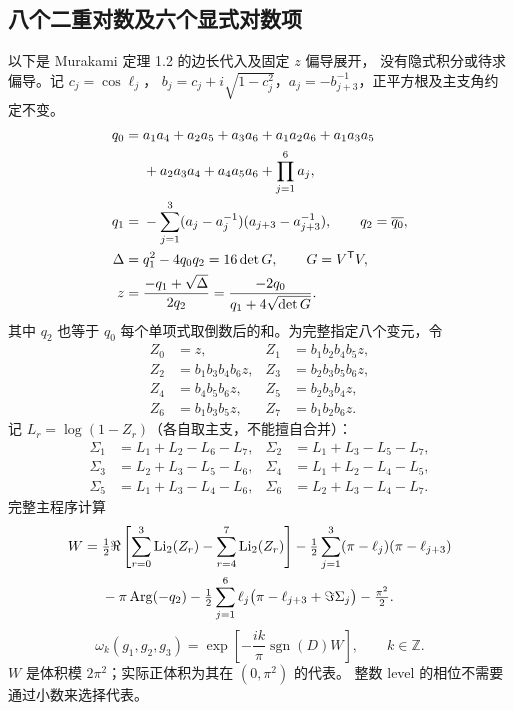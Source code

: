 \subsection{八个二重对数及六个显式对数项}

以下是 Murakami 定理 1.2 的边长代入及固定 $z$ 偏导展开，
没有隐式积分或待求偏导。记 $c_j=\cos\ell_j$，
$b_j=c_j+i\sqrt{1-c_j^2}$，$a_j=-b_{j+3}^{-1}$，正平方根及主支角约定不变。
\begin{align}
q_0={}&a_1a_4+a_2a_5+a_3a_6+a_1a_2a_6+a_1a_3a_5\notag\\
 &+a_2a_3a_4+a_4a_5a_6+\prod_{j=1}^6a_j,\\
q_1={}&-\sum_{j=1}^3(a_j-a_j^{-1})(a_{j+3}-a_{j+3}^{-1}),
\qquad q_2=\overline{q_0},\\
\Delta={}&q_1^2-4q_0q_2=16\det G,\qquad G=V^{\mathsf T}V,\\
z={}&\frac{-q_1+\sqrt\Delta}{2q_2}
     =\frac{-2q_0}{q_1+4\sqrt{\det G}}.
\end{align}
其中 $q_2$ 也等于 $q_0$ 每个单项式取倒数后的和。为完整指定八个变元，令
\begin{align}
 Z_0&=z,&Z_1&=b_1b_2b_4b_5z,\\
 Z_2&=b_1b_3b_4b_6z,&Z_3&=b_2b_3b_5b_6z,\\
 Z_4&=b_4b_5b_6z,&Z_5&=b_2b_3b_4z,\\
 Z_6&=b_1b_3b_5z,&Z_7&=b_1b_2b_6z.
\end{align}
记 $L_r=\log(1-Z_r)$（各自取主支，不能擅自合并）：
\begin{align}
\Sigma_1&=L_1+L_2-L_6-L_7,&\Sigma_2&=L_1+L_3-L_5-L_7,\\
\Sigma_3&=L_2+L_3-L_5-L_6,&\Sigma_4&=L_1+L_2-L_4-L_5,\\
\Sigma_5&=L_1+L_3-L_4-L_6,&\Sigma_6&=L_2+L_3-L_4-L_7.
\end{align}
完整主程序计算
\begin{align}
W={}&\tfrac12\Re\left[\sum_{r=0}^3\operatorname{Li}_2(Z_r)-\sum_{r=4}^7\operatorname{Li}_2(Z_r)\right]
 -\tfrac12\sum_{j=1}^3(\pi-\ell_j)(\pi-\ell_{j+3})\notag\\
&-\pi\operatorname{Arg}(-q_2)
 -\tfrac12\sum_{j=1}^6\ell_j\bigl(\pi-\ell_{j+3}+\Im\Sigma_j\bigr)-\tfrac{\pi^2}{2}.
\end{align}
\begin{equation}
\boxed{\omega_k(g_1,g_2,g_3)={}
 \exp\!\left[-\frac{ik}{\pi}\operatorname{sgn}(D)W\right]},\qquad k\in\mathbb Z.
\label{eq:exact-master-phase}
\end{equation}
$W$ 是体积模 $2\pi^2$；实际正体积为其在 $(0,\pi^2)$ 的代表。
整数 level 的相位不需要通过小数来选择代表。

